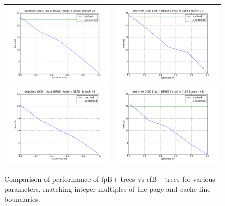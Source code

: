 \documentclass{article}
\begin{document}
\begin{figure}[h]
\begin{tabular}{l l}
\includegraphics[width=250pt]{4096_256_24} &
\includegraphics[width=250pt]{8192_256_24} \\
\includegraphics[width=250pt]{4096_512_48} &
\includegraphics[width=250pt]{8192_512_48} \\
\end{tabular}
\caption{
Comparison of performance of fpB+ trees vs cfB+ trees for various parameters,
matching integer multiples of the page and cache line boundaries.
}
\label{fig:cachehits2}
\end{figure}
\end{document}
